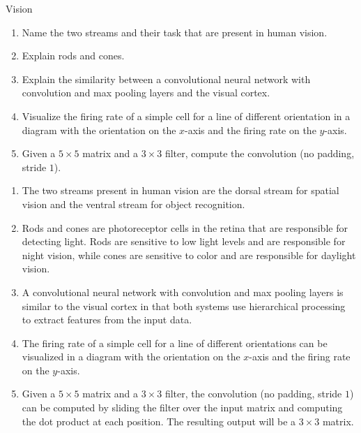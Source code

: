 \documentclass{article}
\begin{document}
\begin{exercise}{Vision}
  \begin{enumerate}
    \item Name the two streams and their task that are present in human vision.
    \item Explain rods and cones.
    \item Explain the similarity between a convolutional neural network with convolution and max pooling layers and the visual cortex.
    \item Visualize the firing rate of a simple cell for a line of different orientation in a diagram with the orientation on the $x$-axis and the firing rate on the $y$-axis.
    \item Given a $5 \times 5$ matrix and a $3 \times 3$ filter, compute the convolution (no padding, stride $1$).
  \end{enumerate}

  \begin{solution}
    \begin{enumerate}
      \item The two streams present in human vision are the dorsal stream for spatial vision and the ventral stream for object recognition.
      \item Rods and cones are photoreceptor cells in the retina that are responsible for detecting light. Rods are sensitive to low light levels and are responsible for night vision, while cones are sensitive to color and are responsible for daylight vision.
      \item A convolutional neural network with convolution and max pooling layers is similar to the visual cortex in that both systems use hierarchical processing to extract features from the input data.
      \item The firing rate of a simple cell for a line of different orientations can be visualized in a diagram with the orientation on the $x$-axis and the firing rate on the $y$-axis.
      \item Given a $5 \times 5$ matrix and a $3 \times 3$ filter, the convolution (no padding, stride $1$) can be computed by sliding the filter over the input matrix and computing the dot product at each position. The resulting output will be a $3 \times 3$ matrix.
    \end{enumerate}
  \end{solution}
\end{exercise}
\end{document}
